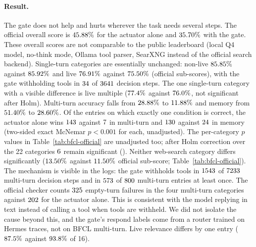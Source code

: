 \documentclass[10pt]{article}
\begin{document}
\paragraph{Result.} The gate does not help and hurts wherever the task needs several steps. The official overall score is $45.88\%$ for the actuator alone and $35.70\%$ with the gate. These overall scores are not comparable to the public leaderboard (local Q4 model, no-think mode, Ollama tool parser, SearXNG instead of the official search backend). Single-turn categories are essentially unchanged: non-live $85.85\%$ against $85.92\%$ and live $76.91\%$ against $75.50\%$ (official sub-scores), with the gate withholding tools in $34$ of $3641$ decision steps. The one single-turn category with a visible difference is live multiple ($77.4\%$ against $76.0\%$, not significant after Holm). Multi-turn accuracy falls from $28.88\%$ to $11.88\%$ and memory from $51.40\%$ to $28.60\%$. Of the entries on which exactly one condition is correct, the actuator alone wins $143$ against $7$ in multi-turn and $130$ against $24$ in memory (two-sided exact McNemar $p<0.001$ for each, unadjusted). The per-category $p$ values in Table~\ref{tab:bfcl-official} are unadjusted too; after Holm correction over the 22 categories $6$ remain significant (\bfHolmList{}). Neither web-search category differs significantly ($13.50\%$ against $11.50\%$ official sub-score; Table~\ref{tab:bfcl-official}). The mechanism is visible in the logs: the gate withholds tools in $1543$ of $7233$ multi-turn decision steps and in $573$ of $800$ multi-turn entries at least once. The official checker counts $325$ empty-turn failures in the four multi-turn categories against $202$ for the actuator alone. This is consistent with the model replying in text instead of calling a tool when tools are withheld. We did not isolate the cause beyond this, and the gate's respond labels come from a router trained on Hermes traces, not on BFCL multi-turn. Live relevance differs by one entry ($87.5\%$ against $93.8\%$ of 16).
\end{document}
